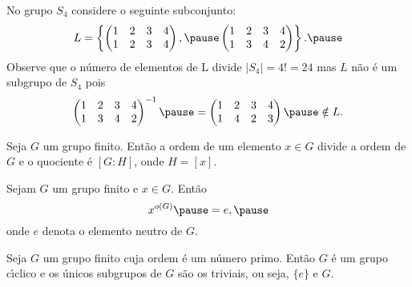 \documentclass{beamer}
\begin{document}
    \begin{frame}
        \begin{observacao}
            No grupo $S_4$ \pause considere o seguinte subconjunto: \pause
            \[
                L = \left\{\begin{pmatrix}
                    1 & 2 & 3 & 4\\
                    1 & 2 & 3 & 4
                \end{pmatrix}, \pause \begin{pmatrix}
                    1 & 2 & 3 & 4\\
                    1 & 3 & 4 & 2
                \end{pmatrix}\right\}. \pause
            \]
            Observe que o n\'umero de elementos de L \pause divide $|S_4| = 4! = 24$ \pause mas $L$ n\~ao \'e um subgrupo de $S_4$ \pause pois
            \[
                \begin{pmatrix}
                    1 & 2 & 3 & 4\\
                    1 & 3 & 4 & 2
                \end{pmatrix}^{-1} \pause = \begin{pmatrix}
                    1 & 2 & 3 & 4\\
                    1 & 4 & 2 & 3
                \end{pmatrix} \pause \notin L.
            \]
        \end{observacao}
    \end{frame}

    \begin{frame}
        \begin{corolario}
            Seja $G$ um grupo finito. \pause Ent\~ao a ordem de um elemento $x \in G$ \pause divide a ordem de $G$ \pause e o quociente \'e $[G : H]$, \pause onde $H = [x]$.
        \end{corolario}
    \end{frame}

    \begin{frame}
        \begin{corolario}
            Sejam $G$ um grupo finito \pause e $x \in G$. \pause Ent\~ao
            \[
                x^{o(G)} \pause = e, \pause
            \]
            onde $e$ denota o elemento neutro de $G$.
        \end{corolario}
    \end{frame}

    \begin{frame}
        \begin{corolario}
            Seja $G$ um grupo finito \pause cuja ordem \'e um n\'umero primo. \pause Ent\~ao $G$ \'e um grupo c{\'\i}clico \pause e os \'unicos subgrupos de $G$ \pause s\~ao os triviais, \pause ou seja, $\{e\}$ e $G$.
        \end{corolario}
    \end{frame}
\end{document}

